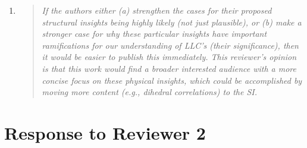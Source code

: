 \documentclass{article}
\begin{document}
\begin{enumerate}
	\item \begin{quote}
    \textit{If the authors either (a) strengthen the cases for their proposed structural insights being  highly 
    likely (not just plausible), or (b) make a stronger case for why these particular insights have important 
    ramifications for our understanding of LLC's (their significance), then it would be easier to publish this 
    immediately. This reviewer's opinion is that this work would find a broader interested audience with a more
    concise focus on these physical insights, which could be accomplished by moving more content 
    (e.g., dihedral correlations) to the SI.}
    \end{quote}
	
\end{enumerate}

\section{Response to Reviewer 2}
\end{document}
